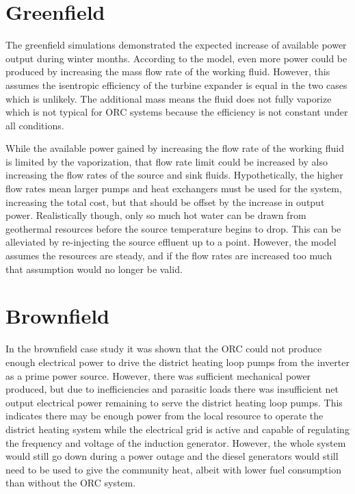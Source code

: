 \section{Greenfield}
The greenfield simulations demonstrated the expected increase of available power output during winter months. 
According to the model, even more power could be produced by increasing the mass flow rate of the working fluid. However, this assumes the isentropic efficiency of the turbine expander is equal in the two cases which is unlikely. The additional mass means the fluid does not fully vaporize which is not typical for ORC systems because the efficiency is not constant under all conditions. 

While the available power gained by increasing the flow rate of the working fluid is limited by the vaporization, that flow rate limit could be increased by also increasing the flow rates of the source and sink fluids. Hypothetically, the higher flow rates mean larger pumps and heat exchangers must be used for the system, increasing the total cost, but that should be offset by the increase in output power. Realistically though, only so much hot water can be drawn from geothermal resources before the source temperature begins to drop. This can be alleviated by re-injecting the source effluent up to a point. However, the model assumes the resources are steady, and if the flow rates are increased too much that assumption would no longer be valid.


\section{Brownfield}
In the brownfield case study it was shown that the ORC could not produce enough electrical power to drive the district heating loop pumps from the inverter as a prime power source.
However, there was sufficient mechanical power produced, but due to inefficiencies and parasitic loads there was insufficient net output electrical power remaining to serve the district heating loop pumps. 
This indicates there may be enough power from the local resource to operate the district heating system while the electrical grid is active and capable of regulating the frequency and voltage of the induction generator. However, the whole system would still go down during a power outage and the diesel generators would still need to be used to give the community heat, albeit with lower fuel consumption than without the ORC system.

